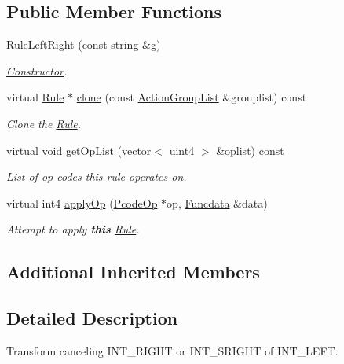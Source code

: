 \subsection*{Public Member Functions}
\begin{DoxyCompactItemize}
\item 
\mbox{\hyperlink{class_rule_left_right_a8bdf566e71f6b94ad9e00efa29767ab4}{Rule\+Left\+Right}} (const string \&g)
\begin{DoxyCompactList}\small\item\em \mbox{\hyperlink{class_constructor}{Constructor}}. \end{DoxyCompactList}\item 
virtual \mbox{\hyperlink{class_rule}{Rule}} $\ast$ \mbox{\hyperlink{class_rule_left_right_aee62a865007b1395cf9716d3e1360111}{clone}} (const \mbox{\hyperlink{class_action_group_list}{Action\+Group\+List}} \&grouplist) const
\begin{DoxyCompactList}\small\item\em Clone the \mbox{\hyperlink{class_rule}{Rule}}. \end{DoxyCompactList}\item 
virtual void \mbox{\hyperlink{class_rule_left_right_abc57bab7e4b6cc0b7ca4b91cba34b7cd}{get\+Op\+List}} (vector$<$ uint4 $>$ \&oplist) const
\begin{DoxyCompactList}\small\item\em List of op codes this rule operates on. \end{DoxyCompactList}\item 
virtual int4 \mbox{\hyperlink{class_rule_left_right_af92aaefc1e7def3b544a0d54adf4018f}{apply\+Op}} (\mbox{\hyperlink{class_pcode_op}{Pcode\+Op}} $\ast$op, \mbox{\hyperlink{class_funcdata}{Funcdata}} \&data)
\begin{DoxyCompactList}\small\item\em Attempt to apply {\bfseries{this}} \mbox{\hyperlink{class_rule}{Rule}}. \end{DoxyCompactList}\end{DoxyCompactItemize}
\subsection*{Additional Inherited Members}


\subsection{Detailed Description}
Transform canceling I\+N\+T\+\_\+\+R\+I\+G\+HT or I\+N\+T\+\_\+\+S\+R\+I\+G\+HT of I\+N\+T\+\_\+\+L\+E\+FT. 

